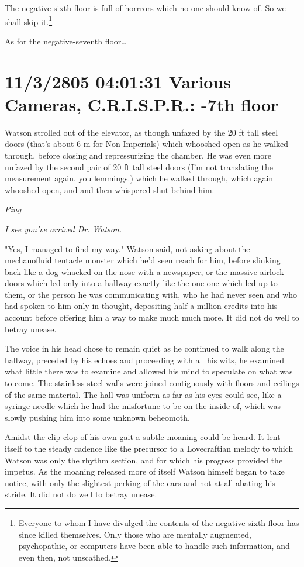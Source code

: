 \documentclass[12pt]{book}
\begin{document}
The negative-sixth floor is full of horrrors which no one should know of. So we shall skip it.\footnote{Everyone to whom I have divulged the contents of the negative-sixth floor has since killed themselves. Only those who are mentally augmented, psychopathic, or computers have been able to handle such information, and even then, not unscathed.}

As for the negative-seventh floor\ldots{}

\section*{11/3/2805 04:01:31 Various Cameras, C.R.I.S.P.R.: -7th floor}
\label{sec:org4750f79}

Watson strolled out of the elevator, as though unfazed by the 20 ft tall steel doors (that's about 6 m for Non-Imperials) which whooshed open as he walked through, before closing and repressurizing the chamber. He was even more unfazed by the second pair of 20 ft tall steel doors (I'm not translating the measurement again, you lemmings.) which he walked through, which again whooshed open, and and then whispered shut behind him.

\emph{Ping}

\emph{I see you've arrived Dr. Watson.}

"Yes, I managed to find my way." Watson said, not asking about the mechanofluid tentacle monster which he'd seen reach for him, before slinking back like a dog whacked on the nose with a newspaper, or the massive airlock doors which led only into a hallway exactly like the one one which led up to them, or the person he was communicating with, who he had never seen and who had spoken to him only in thought, depositing half a million credits into his account before offering him a way to make much much more. It did not do well to betray unease.

The voice in his head chose to remain quiet as he continued to walk along the hallway, preceded by his echoes and proceeding with all his wits, he examined what little there was to examine and allowed his mind to speculate on what was to come. The stainless steel walls were joined contiguously with floors and ceilings of the same material. The hall was uniform as far as his eyes could see, like a syringe needle which he had the misfortune to be on the inside of, which was slowly pushing him into some unknown beheomoth.

Amidst the clip clop of his own gait a subtle moaning could be heard. It lent itself to the steady cadence like the precursor to a Lovecraftian melody to which Watson was only the rhythm section, and for which his progress provided the impetus. As the moaning released more of itself Watson himself began to take notice, with only the slightest perking of the ears and not at all abating his stride. It did not do well to betray unease.
\end{document}
